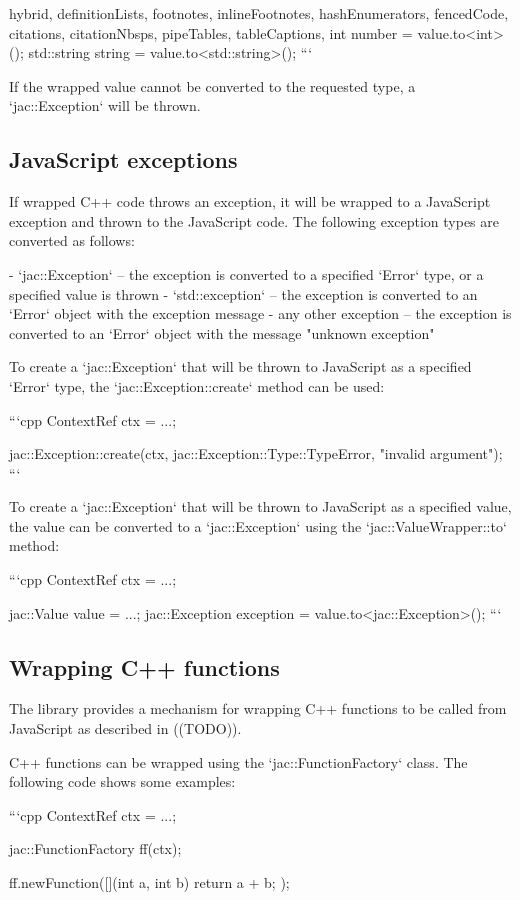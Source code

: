 \documentclass[
  digital,
  oneside,
  nosansbold,
  nocolorbold,
  lof,
  lot
]{fithesis4}
\begin{document}
\begin{markdown*}{%
  hybrid,
  definitionLists,
  footnotes,
  inlineFootnotes,
  hashEnumerators,
  fencedCode,
  citations,
  citationNbsps,
  pipeTables,
  tableCaptions,
}
int number = value.to<int>();
std::string string = value.to<std::string>();
```

If the wrapped value cannot be converted to the requested type, a `jac::Exception` will be thrown.

\subsection{JavaScript exceptions}

If wrapped C++ code throws an exception, it will be wrapped to a JavaScript exception and thrown to the JavaScript code. The following exception types are converted as follows:

  - `jac::Exception` -- the exception is converted to a specified `Error` type, or a specified value is thrown
  - `std::exception` -- the exception is converted to an `Error` object with the exception message
  - any other exception -- the exception is converted to an `Error` object with the message "unknown exception"

To create a `jac::Exception` that will be thrown to JavaScript as a specified `Error` type, the `jac::Exception::create` method can be used:

```cpp
ContextRef ctx = ...;

jac::Exception::create(ctx, jac::Exception::Type::TypeError, "invalid argument");
```

To create a `jac::Exception` that will be thrown to JavaScript as a specified value, the value can be converted to a `jac::Exception` using the `jac::ValueWrapper::to` method:

```cpp
ContextRef ctx = ...;

jac::Value value = ...;
jac::Exception exception = value.to<jac::Exception>();
```

\subsection{Wrapping C++ functions}

The library provides a mechanism for wrapping C++ functions to be called from JavaScript as described in ((TODO)).

C++ functions can be wrapped using the `jac::FunctionFactory` class. The following code shows some examples:

```cpp
ContextRef ctx = ...;

jac::FunctionFactory ff(ctx);

ff.newFunction([](int a, int b) { return a + b; });


\end{markdown*}
\end{document}

